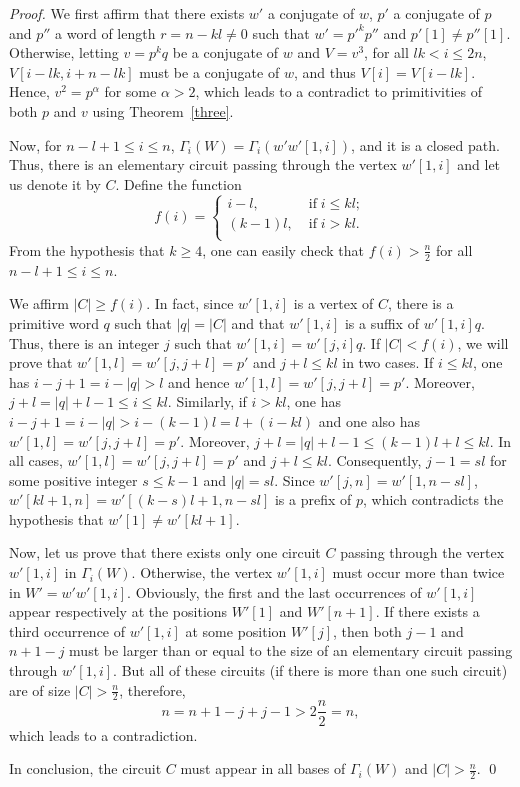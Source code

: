 \documentclass[runningheads,envcountsame,a4paper]{llncs}
\begin{document}
\begin{proof}
We first affirm that there exists $w'$ a conjugate of $w$, $p'$ a conjugate of $p$ and $p''$ a word of length $r=n-kl\neq 0$ such that $w'=p'^kp''$ and $p'[1] \neq p''[1]$. Otherwise, letting $v=p^kq$ be a conjugate of $w$ and $V=v^3$, for all $lk<i\leq 2n$, $V[i-lk,i+n-lk]$ must be a conjugate of $w$, and thus $V[i]=V[i-lk]$. Hence,  $v^2=p^{\alpha}$ for some $\alpha>2$, which leads to a contradict to primitivities of both $p$ and $v$ using Theorem~\ref{three}.

 Now, for $n-l+1 \leq i \leq n$, $\Gamma_i(W)=\Gamma_i(w'w'[1,i])$, and it is a closed path. Thus, there is an elementary circuit passing through the vertex $w'[1,i]$ and let us denote it by $C$. Define the function
$$f(i)=\begin{cases}
    i-l,& \; \text{if} \;i \leq kl;\\
    (k-1)l,&\; \text{if} \;i > kl.\\
\end{cases}$$
From the hypothesis that $k \geq 4$, one can easily check that $f(i)> \frac{n}{2}$ for all $n-l+1 \leq i\leq n$. 

We affirm $|C|\geq f(i)$. In fact, since $w'[1,i]$ is a vertex of $C$, there is a primitive word $q$ such that $|q|=|C|$ and that $w'[1,i]$ is a suffix of $w'[1,i]q$. Thus, there is an integer $j$ such that $w'[1,i]=w'[j,i]q$. If $|C|<f(i)$, we will prove that $w'[1,l]=w'[j,j+l]=p'$ and $j+l \leq kl$ in two cases. If $i \leq kl$,  one has $i-j+1=i-|q|> l$ and hence $w'[1,l]=w'[j,j+l]=p'$. Moreover, $j+l=|q|+l-1\leq i\leq kl$. Similarly, if $i > kl$, one has $i-j+1=i-|q|> i-(k-1)l=l+(i-kl)$ and one also has $w'[1,l]=w'[j,j+l]=p'$. Moreover, $j+l=|q|+l-1\leq (k-1)l+l\leq kl$. In all cases, $w'[1,l]=w'[j,j+l]=p'$ and $j+l \leq kl$. Consequently, $j-1=sl$ for some positive integer $s\leq k-1$ and $|q|=sl$. Since $w'[j,n]=w'[1,n-sl]$, $w'[kl+1,n]=w'[(k-s)l+1,n-sl]$ is a prefix of $p$, which contradicts the hypothesis that $w'[1] \neq w'[kl+1]$.

Now, let us prove that there exists only one circuit $C$ passing through the vertex $w'[1,i]$ in $\Gamma_i(W)$. Otherwise, the vertex $w'[1,i]$ must occur more than twice in $W'=w'w'[1,i]$. Obviously, the first and the last occurrences of $w'[1,i]$ appear respectively at the positions $W'[1]$ and $W'[n+1]$. If there exists a third occurrence of $w'[1,i]$ at some position $W'[j]$, then both $j-1$ and $n+1-j$ must be larger than or equal to the size of an elementary circuit passing through $w'[1,i]$. But all of these circuits (if there is more than one such circuit) are of size $|C|> \frac{n}{2}$, therefore, $$n=n+1-j+j-1> 2\frac{n}{2}=n,$$ which leads to a contradiction.

In conclusion, the circuit $C$ must appear in all bases of $\Gamma_i(W)$ and $|C| >\frac{n}{2}$. \qed
\end{proof}
\end{document}
